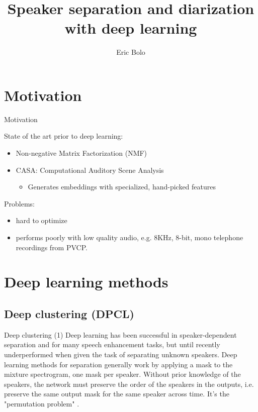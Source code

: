 \documentclass[11pt]{beamer}
\author{Eric Bolo}
\title{Speaker separation and diarization \linebreak with deep learning}
\institute{Batvoice}
\begin{document}
\begin{frame}
\titlepage
\end{frame}

\begin{frame}
\tableofcontents
\end{frame}

\section{Motivation}
\begin{frame}{Motivation}

State of the art prior to deep learning:

\begin{itemize}
\item Non-negative Matrix Factorization (NMF)
\item CASA: Computational Auditory Scene Analysis
	\begin{itemize}
		\item Generates embeddings with specialized, hand-picked features
	\end{itemize}
\end{itemize}

Problems:
\begin{itemize}
\item hard to optimize
\item performs poorly with low quality audio, e.g. 8KHz, 8-bit, mono telephone recordings from PVCP.
\end{itemize}

\end{frame}
\section{Deep learning methods}
\subsection{Deep clustering (DPCL)}

\begin{frame}{Deep clustering (1)}
Deep learning has been successful in speaker-dependent separation and for many speech enhancement tasks, but until recently underperformed when given the task of separating unknown speakers.
\linebreak
\linebreak
Deep learning methods for separation generally work by applying a mask to the mixture spectrogram, one mask per speaker.
\linebreak
\linebreak
Without prior knowledge of the speakers, the network must preserve the order of the speakers in the outputs, i.e. preserve the same output mask for the same speaker across time. It's the "permutation problem" \cite{1607.02173}.
\end{frame}
\end{document}
